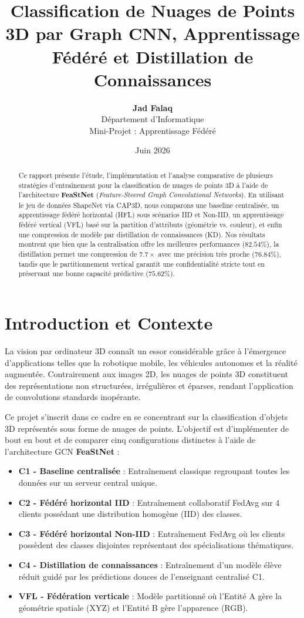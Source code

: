 \documentclass[11pt,a4paper]{article}
\title{\textbf{Classification de Nuages de Points 3D par Graph CNN, Apprentissage Fédéré et Distillation de Connaissances}}
\author{\textbf{Jad Falaq } \\ Département d'Informatique \\ Mini-Projet : Apprentissage Fédéré}
\date{Juin 2026}
\begin{document}
\maketitle

\begin{abstract}
Ce rapport présente l'étude, l'implémentation et l'analyse comparative de plusieurs stratégies d'entraînement pour la classification de nuages de points 3D à l'aide de l'architecture \textbf{FeaStNet} (\textit{Feature-Steered Graph Convolutional Networks}). En utilisant le jeu de données ShapeNet via CAP3D, nous comparons une baseline centralisée, un apprentissage fédéré horizontal (HFL) sous scénarios IID et Non-IID, un apprentissage fédéré vertical (VFL) basé sur la partition d'attributs (géométrie vs. couleur), et enfin une compression de modèle par distillation de connaissances (KD). Nos résultats montrent que bien que la centralisation offre les meilleures performances ($82.54\%$), la distillation permet une compression de $7.7\times$ avec une précision très proche ($76.84\%$), tandis que le partitionnement vertical garantit une confidentialité stricte tout en préservant une bonne capacité prédictive ($75.62\%$).
\end{abstract}

\newpage

\section{Introduction et Contexte}
La vision par ordinateur 3D connaît un essor considérable grâce à l'émergence d'applications telles que la robotique mobile, les véhicules autonomes et la réalité augmentée. Contrairement aux images 2D, les nuages de points 3D constituent des représentations non structurées, irrégulières et éparses, rendant l'application de convolutions standards inopérante.

Ce projet s'inscrit dans ce cadre en se concentrant sur la classification d'objets 3D représentés sous forme de nuages de points. L'objectif est d'implémenter de bout en bout et de comparer cinq configurations distinctes à l'aide de l'architecture GCN \textbf{FeaStNet} :
\begin{itemize}
    \item \textbf{C1 - Baseline centralisée} : Entraînement classique regroupant toutes les données sur un serveur central unique.
    \item \textbf{C2 - Fédéré horizontal IID} : Entraînement collaboratif FedAvg sur 4 clients possédant une distribution homogène (IID) des classes.
    \item \textbf{C3 - Fédéré horizontal Non-IID} : Entraînement FedAvg où les clients possèdent des classes disjointes représentant des spécialisations thématiques.
    \item \textbf{C4 - Distillation de connaissances} : Entraînement d'un modèle élève réduit guidé par les prédictions douces de l'enseignant centralisé C1.
    \item \textbf{VFL - Fédération verticale} : Modèle partitionné où l'Entité A gère la géométrie spatiale (XYZ) et l'Entité B gère l'apparence (RGB).
\end{itemize}
\end{document}

